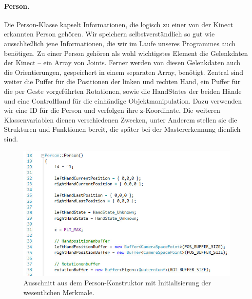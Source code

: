 	\paragraph{Person.} Die Person-Klasse kapselt Informationen, die logisch zu einer von der Kinect erkannten Person gehören. Wir speichern selbstverständlich so gut wie ausschließlich jene Informationen, die wir im Laufe unseres Programmes auch benötigen. Zu einer Person gehören als wohl wichtigstes Element die Gelenkdaten der Kinect -- ein Array von Joints. Ferner werden von diesen Gelenkdaten auch die Orientierungen, gespeichert in einem separaten Array, benötigt. Zentral sind weiter die Puffer für die Positionen der linken und rechten Hand, ein Puffer für die per Geste vorgeführten Rotationen, sowie die HandStates der beiden Hände und eine \glqq ControlHand\grqq{} für die einhändige Objektmanipulation. Dazu verwenden wir eine ID für die Person und verfolgen ihre z-Koordinate. Die weiteren Klassenvariablen dienen verschiedenen Zwecken, unter Anderem stellen sie die Strukturen und Funktionen bereit, die später bei der Mastererkennung dienlich sind.
	\begin{figure}[h]
	\centering
	\includegraphics[scale=.5]{pictures/person.jpg}
	\caption{Ausschnitt aus dem Person-Konstruktor mit Initialisierung der wesentlichen Merkmale.}
	\end{figure}\par\medskip
